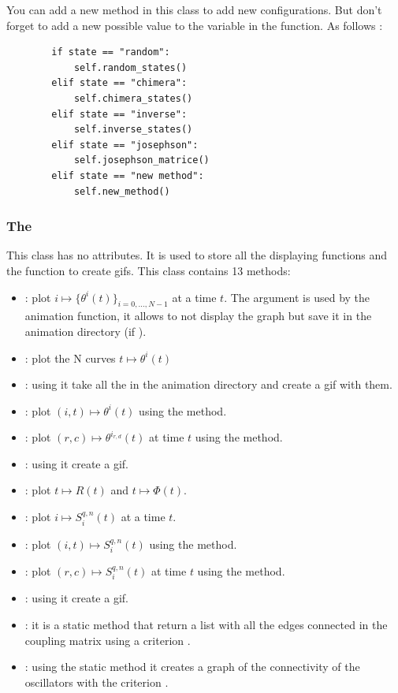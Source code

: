 \documentclass[1pt, a4paper]{article}
\begin{document}
You can add a new method in this class to add new configurations. But don't forget to add a new possible value to the  variable in the  function. As follows :
\begin{verbatim}
        if state == "random":
            self.random_states()
        elif state == "chimera":
            self.chimera_states()
        elif state == "inverse":
            self.inverse_states()
        elif state == "josephson":
            self.josephson_matrice()
        elif state == "new method":
            self.new_method()
\end{verbatim}
\subsubsection{The }
\label{subsubs:graph}
This class has no attributes. It is used to store all the displaying functions and the function to create gifs. This class contains 13 methods:
\begin{itemize}[itemsep=0pt]
    \item {} : plot $i\longmapsto\{\theta^i(t)\}_{i=0,...,N-1}$ at a time $t$. The argument  is used by the animation function, it allows to not display the graph but save it in the animation directory (if ).
    \item {} : plot the N curves $t\longmapsto\theta^i(t)$
    \item {} : using  it take all the  in the animation directory and create a gif with them.
    \item {} : plot $(i,t)\longmapsto \theta^i (t)$ using the  method. 
    \item {} : plot $(r,c)\longmapsto \theta^{i_{r,d}} (t)$ at time $t$ using the  method.
    \item {} : using  it create a gif.
    \item {} : plot $t \longmapsto R(t)$ and $t \longmapsto \Phi(t)$.
    \item {} : plot $i \longmapsto S_i^{q, n}(t)$ at a time $t$.
    \item {} : plot $(i,t) \longmapsto S_i^{q, n}(t)$ using the  method.
    \item {} : plot $(r,c) \longmapsto S_i^{q, n}(t)$ at time $t$ using the  method.
    \item {} : using  it create a gif.
    \item {} : it is a static method that return a list with all the edges connected in the coupling matrix  using a criterion .
    \item {} : using the static method  it creates a graph of the connectivity of the oscillators with the criterion .
\end{itemize}
\end{document}
